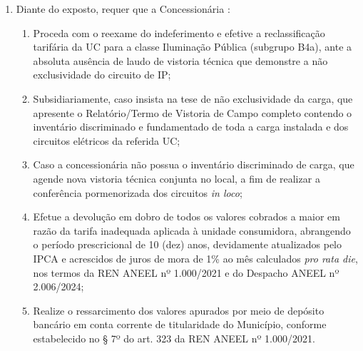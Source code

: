 \begin{enumerate}[resume]
\item Diante do exposto, requer que a Concessionária \nomeConcessionaria{}:

\begin{enumerate}
    \item Proceda com o reexame do indeferimento e efetive a reclassificação tarifária da UC \unidadeConsumidora{} para a classe Iluminação Pública (subgrupo B4a), ante a absoluta ausência de laudo de vistoria técnica que demonstre a não exclusividade do circuito de IP;

    \item Subsidiariamente, caso insista na tese de não exclusividade da carga, que apresente o Relatório/Termo de Vistoria de Campo completo contendo o inventário discriminado e fundamentado de toda a carga instalada e dos circuitos elétricos da referida UC;

    \item Caso a concessionária não possua o inventário discriminado de carga, que agende nova vistoria técnica conjunta no local, a fim de realizar a conferência pormenorizada dos circuitos \textit{in loco};

    \item Efetue a devolução em dobro de todos os valores cobrados a maior em razão da tarifa inadequada aplicada à unidade consumidora, abrangendo o período prescricional de 10 (dez) anos, devidamente atualizados pelo IPCA e acrescidos de juros de mora de 1\% ao mês calculados \textit{pro rata die}, nos termos da REN ANEEL nº 1.000/2021 e do Despacho ANEEL nº 2.006/2024;

    \item Realize o ressarcimento dos valores apurados por meio de depósito bancário em conta corrente de titularidade do Município, conforme estabelecido no § 7º do art. 323 da REN ANEEL nº 1.000/2021.
\end{enumerate}
\end{enumerate}